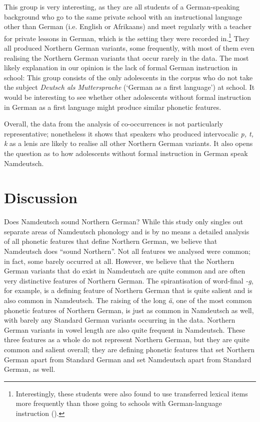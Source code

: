 \documentclass[output=paper]{langsci/langscibook}
\begin{document}
This group is very interesting, as they are all students of a German-speaking background who go to the same private school with an instructional language other than German (i.e. English or Afrikaans) and meet regularly with a teacher for private lessons in German, which is the setting they were recorded in.\footnote{Interestingly, these students were also found to use transferred lexical items more frequently than those going to schools with German-language instruction ().} They all produced Northern German variants, some frequently, with most of them even realising the Northern German variants that occur rarely in the data. The most likely explanation in our opinion is the lack of formal German instruction in school: This group consists of the only adolescents in the corpus who do not take the subject \textit{Deutsch als Muttersprache} (‘German as a first language’) at school. It would be interesting to see whether other adolescents without formal instruction in German as a first language might produce similar phonetic features.

Overall, the data from the analysis of co-occurrences is not particularly representative; nonetheless it shows that speakers who produced intervocalic \textit{p, t, k} as a lenis are likely to realise all other Northern German variants. It also opens the question as to how adolescents without formal instruction in German speak Namdeutsch.

\section{Discussion}
\label{sec:stuhl:5}

Does Namdeutsch sound Northern German? While this study only singles out separate areas of Namdeutsch phonology and is by no means a detailed analysis of all phonetic features that define Northern German, we believe that Namdeutsch does “sound Northern”. Not all features we analysed were common; in fact, some barely occurred at all. However, we believe that the Northern German variants that do exist in Namdeutsch are quite common and are often very distinctive features of Northern German. The spirantisation of word-final \textit{-g}, for example, is a defining feature of Northern German that is quite salient \citep[269]{elmentaler_norddeutscher_2015} and is also common in Namdeutsch. The raising of the long \textit{ä}, one of the most common phonetic features of Northern German, is just as common in Namdeutsch as well, with barely any Standard German variants occurring in the data. Northern German variants in vowel length are also quite frequent in Namdeutsch. These three features as a whole do not represent Northern German, but they are quite common and salient overall; they are defining phonetic features that set Northern German apart from Standard German and set Namdeutsch apart from Standard German, as well. 
\end{document}

